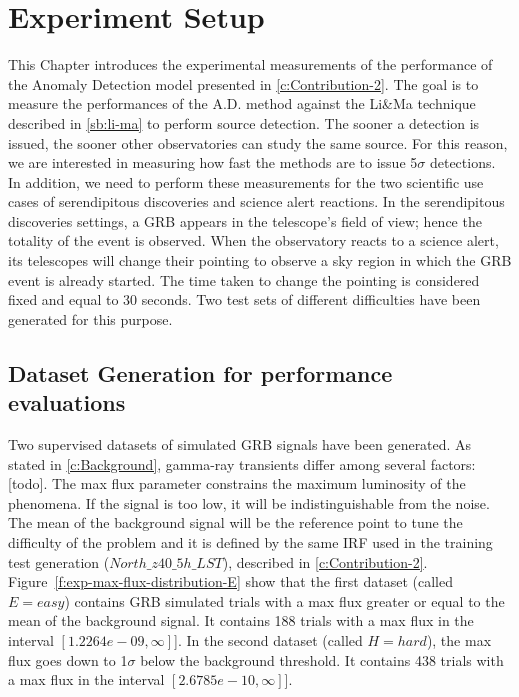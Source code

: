 \section{Experiment Setup}
\label{s:Experiment-Setup}

This Chapter introduces the experimental measurements of the performance of the Anomaly Detection model presented in \autoref{c:Contribution-2}.
The goal is to measure the performances of the A.D. method against the Li\&Ma technique described in \autoref{sb:li-ma} to perform source detection. The sooner a detection is issued, the sooner other observatories can study the same source. For this reason, we are interested in measuring how fast the methods are to issue 5$\sigma$ detections.
In addition, we need to perform these measurements for the two scientific use cases of serendipitous discoveries and science alert reactions. In the serendipitous discoveries settings, a GRB appears in the telescope's field of view; hence the totality of the event is observed. When the observatory reacts to a science alert, its telescopes will change their pointing to observe a sky region in which the GRB event is already started. The time taken to change the pointing is considered fixed and equal to 30 seconds. Two test sets of different difficulties have been generated for this purpose.

\subsection{Dataset Generation for performance evaluations}
\label{s:Experiment-Data}
Two supervised datasets of simulated GRB signals have been generated. As stated in \autoref{c:Background}, gamma-ray transients differ among several factors: [todo]. The max flux parameter constrains the maximum luminosity of the phenomena. If the signal is too low, it will be indistinguishable from the noise. The mean of the background signal will be the reference point to tune the difficulty of the problem and it is defined by the same IRF used in the training test generation ($North\_z40\_5h\_LST$), described in \autoref{c:Contribution-2}. Figure~\ref{f:exp-max-flux-distribution-E} show that the first dataset (called $E=easy$) contains GRB simulated trials with a max flux greater or equal to the mean of the background signal. It contains 188 trials with a max flux in the interval $[1.2264e-09, \infty]$]. In the second dataset (called $H=hard$), the max flux goes down to 1$\sigma$ below the background threshold. It contains 438 trials with a max flux in the interval $[2.6785e-10, \infty]$].  

